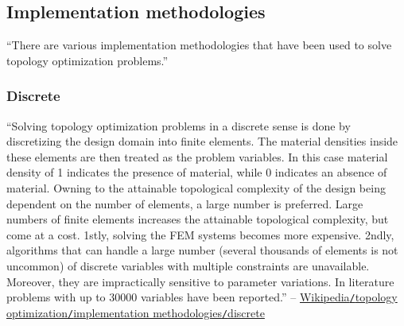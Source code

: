 \documentclass[oneside]{book}
\numberwithin{equation}{section}
\begin{document}
\subsection{Implementation methodologies}
``There are various implementation methodologies that have been used to solve topology optimization problems.''

\subsubsection{Discrete}
``Solving topology optimization problems in a discrete sense is done by discretizing the design domain into finite elements. The material densities inside these elements are then treated as the problem variables. In this case material density of 1 indicates the presence of material, while 0 indicates an absence of material. Owning to the attainable topological complexity of the design being dependent on the number of elements, a large number is preferred. Large numbers of finite elements increases the attainable topological complexity, but come at a cost. 1stly, solving the FEM systems becomes more expensive. 2ndly, algorithms that can handle a large number (several thousands of elements is not uncommon) of discrete variables with multiple constraints are unavailable. Moreover, they are impractically sensitive to parameter variations. In literature problems with up to 30000 variables have been reported.'' -- \href{https://en.wikipedia.org/wiki/Topology_optimization#Discrete}{Wikipedia\texttt{/}topology optimization\texttt{/}implementation methodologies\texttt{/}discrete}
\end{document}
